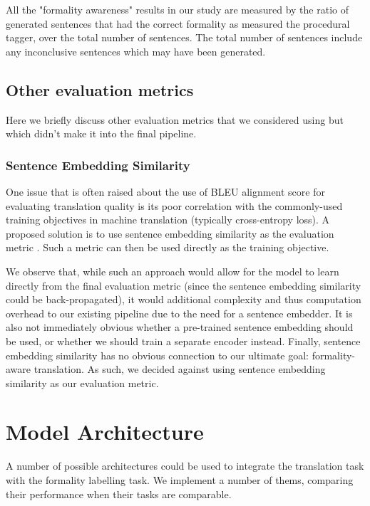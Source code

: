 \documentclass[11pt]{article}
\begin{document}
All the "formality awareness" results in our study are measured by the ratio of generated sentences that had the correct formality as measured the procedural tagger, over the total number of sentences. The total number of sentences include any inconclusive sentences which may have been generated. 

\subsection{Other evaluation metrics}

Here we briefly discuss other evaluation metrics that we considered using but which didn't make it into the final pipeline.

\subsubsection{Sentence Embedding Similarity}

One issue that is often raised about the use of BLEU alignment score for evaluating translation quality is its poor correlation with the commonly-used training objectives in machine translation (typically cross-entropy loss). A proposed solution is to use sentence embedding similarity as the evaluation metric \cite{wieting2019bleu}. Such a metric can then be used directly as the training objective.

We observe that, while such an approach would allow for the model to learn directly from the final evaluation metric (since the sentence embedding similarity could be back-propagated), it would additional complexity and thus computation overhead to our existing pipeline due to the need for a sentence embedder. It is also not immediately obvious whether a pre-trained sentence embedding should be used, or whether we should train a separate encoder instead. Finally, sentence embedding similarity has no obvious connection to our ultimate goal: formality-aware translation. As such, we decided against using sentence embedding similarity as our evaluation metric.

\section{Model Architecture}

A number of possible architectures could be used to integrate the translation task with the formality labelling task. We implement a number of thems, comparing their performance when their tasks are comparable.
\end{document}
